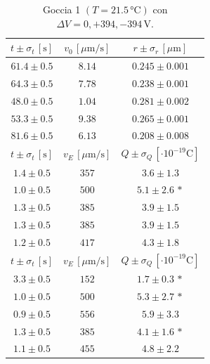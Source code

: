 \documentclass[]{article}
\begin{document}
    \begin{table}[H]
        \centering
        \begin{tabular}{||c|c|c||}
            \hline
            $t \pm \sigma_t \, \left[\text{s}\right]$ & $v_0 \, \left[\mu\text{m/s}\right]$ & $r \pm \sigma_r \, \left[\mu\text{m}\right]$ \\\hline
            \hline
            $61.4 \pm 0.5$ & $8.14$ & $0.245 \pm 0.001$ \\\hline
            $64.3 \pm 0.5$ & $7.78$ & $0.238 \pm 0.001$ \\\hline
            $48.0 \pm 0.5$ & $1.04$ & $0.281 \pm 0.002$ \\\hline
            $53.3 \pm 0.5$ & $9.38$ & $0.265 \pm 0.001$ \\\hline
            $81.6 \pm 0.5$ & $6.13$ & $0.208 \pm 0.008$ \\\hline
            \hline
            $t \pm \sigma_t \, \left[\text{s}\right]$ & $v_E \, \left[\mu\text{m/s}\right]$ & $Q \pm \sigma_Q \, \left[\cdot 10^{-19} \text{C}\right]$ \\\hline
            \hline
            $1.4 \pm 0.5$ & $357$ & $3.6 \pm 1.3$ \\\hline
            $1.0 \pm 0.5$ & $500$ & $5.1 \pm 2.6 \,\ast$ \\\hline
            $1.3 \pm 0.5$ & $385$ & $3.9 \pm 1.5$ \\\hline
            $1.3 \pm 0.5$ & $385$ & $3.9 \pm 1.5$ \\\hline
            $1.2 \pm 0.5$ & $417$ & $4.3 \pm 1.8$ \\\hline
            \hline
            $t \pm \sigma_t \, \left[\text{s}\right]$ & $v_E \, \left[\mu\text{m/s}\right]$ & $Q \pm \sigma_Q \, \left[\cdot 10^{-19} \text{C}\right]$ \\\hline
            \hline
            $3.3 \pm 0.5$ & $152$ & $1.7 \pm 0.3 \,\ast$ \\\hline
            $1.0 \pm 0.5$ & $500$ & $5.3 \pm 2.7 \,\ast$ \\\hline
            $0.9 \pm 0.5$ & $556$ & $5.9 \pm 3.3$ \\\hline
            $1.3 \pm 0.5$ & $385$ & $4.1 \pm 1.6 \,\ast$ \\\hline
            $1.1 \pm 0.5$ & $455$ & $4.8 \pm 2.2$ \\\hline
        \end{tabular}
        \caption{Goccia 1 $\left(T = 21.5\, \text{°C}\right)$ con $\Delta V = 0,+394,-394 \,\text{V}$.}
        \label{goccia-1}
    \end{table}
\end{document}
